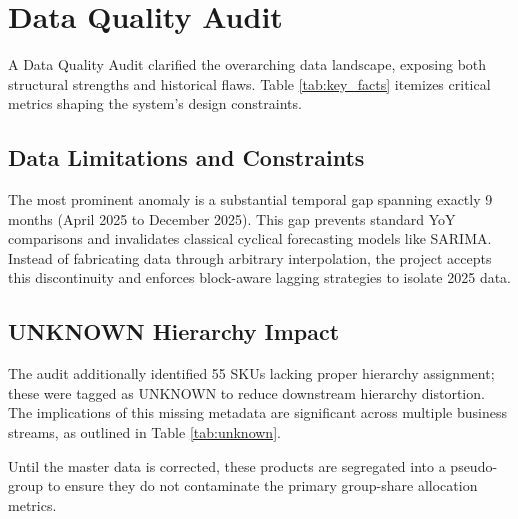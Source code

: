 \section{Data Quality Audit}
A Data Quality Audit clarified the overarching data landscape, exposing both structural strengths and historical flaws. Table \ref{tab:key_facts} itemizes critical metrics shaping the system's design constraints.



\subsection{Data Limitations and Constraints}
The most prominent anomaly is a substantial temporal gap spanning exactly 9 months (April 2025 to December 2025). This gap prevents standard YoY comparisons and invalidates classical cyclical forecasting models like SARIMA. Instead of fabricating data through arbitrary interpolation, the project accepts this discontinuity and enforces block-aware lagging strategies to isolate 2025 data.

\subsection{UNKNOWN Hierarchy Impact}
The audit additionally identified 55 SKUs lacking proper hierarchy assignment; these were tagged as UNKNOWN to reduce downstream hierarchy distortion. The implications of this missing metadata are significant across multiple business streams, as outlined in Table \ref{tab:unknown}.


Until the master data is corrected, these products are segregated into a pseudo-group to ensure they do not contaminate the primary group-share allocation metrics.
\FloatBarrier
